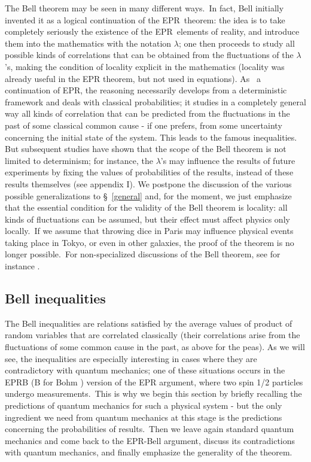\documentclass[12pt,onecolumn]{article}%
\begin{document}
The Bell theorem \cite{Bell-2} may be seen in many different ways.\ In fact,
Bell initially invented it as a logical continuation of the EPR\ theorem: the
idea is to take completely seriously the existence of the EPR\ elements of
reality, and introduce them into the mathematics with the notation $\lambda$;
one then proceeds to study all possible kinds of correlations that can be
obtained from the fluctuations of the $\lambda$'s, making the condition of
locality explicit in the mathematics (locality was already useful in the EPR
theorem, but not used in equations). As \ a continuation of EPR, the reasoning
necessarily develops from a deterministic framework and deals with classical
probabilities; it studies in a completely general way all kinds of correlation
that can be predicted from the fluctuations in the past of some classical
common cause - if one prefers, from some uncertainty concerning the initial
state of the system. This leads to the famous inequalities. But subsequent
studies have shown that the scope of the Bell theorem is not limited to
determinism; for instance, the $\lambda$'s may influence the results of future
experiments by fixing the values of probabilities of the results, instead of
these results themselves (see appendix I). We postpone the discussion of the
various possible generalizations to \S \ \ref{general} and, for the moment, we
just emphasize that the essential condition for the validity of the Bell
theorem is locality: all kinds of fluctuations can be assumed, but their
effect must affect physics only locally.\ If we assume that throwing dice in
Paris may influence physical events taking place in Tokyo, or even in other
galaxies, the proof of the theorem is no longer possible.\ For non-specialized
discussions of the Bell theorem, see for instance \cite{Bertlmann}
\cite{Mermin-moon} \cite{La-Recherche} \cite{FL}.

\subsection{Bell inequalities}

The Bell inequalities are relations satisfied by the average values of product
of random variables that are correlated classically (their correlations arise
from the fluctuations of some common cause in the past, as above for the
peas). As we will see, the inequalities are especially interesting in cases
where they are contradictory with quantum mechanics; one of these situations
occurs in the EPRB (B for Bohm \cite{Bohm-2}) version of the EPR argument,
where two spin 1/2 particles undergo measurements.\ This is why we begin this
section by briefly recalling the predictions of quantum mechanics for such a
physical system - but the only ingredient we need from quantum mechanics at
this stage is the predictions concerning the probabilities of results.\ Then
we leave again standard quantum mechanics and come back to the EPR-Bell
argument, discuss its contradictions with quantum mechanics, and finally
emphasize the generality of the theorem.
\end{document}
